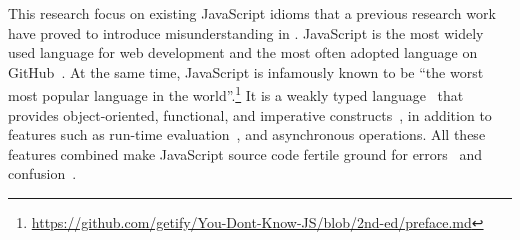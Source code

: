 
This research focus on existing JavaScript idioms that a previous 
research work have proved to introduce misunderstanding in \clang.
JavaScript is the most widely used language for web development and the most often adopted language on GitHub~\cite{BugsJS:ICST}. At the same time, JavaScript is infamously known to be ``the worst most popular language in the world''.\footnote{\url{https://github.com/getify/You-Dont-Know-JS/blob/2nd-ed/preface.md}} It is a weakly typed language~\cite{DynamicBehaviorJS:PLDI} that provides object-oriented, functional, and imperative constructs~\cite{JS-CodeSmells:SCAM}, in addition to features such as run-time evaluation~\cite{BugsJS:ICST,ClientSideBugsJS:TSE}, and asynchronous operations. All these 
features combined make JavaScript source code fertile ground for errors~\cite{BugsJS:ICST,ClientSideBugsJS:TSE} and confusion~\cite{JSGoodParts:book}.

